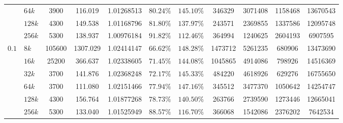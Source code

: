 \begin{table}
{\begin{tabular}{llccccccccc}
 & $64k$ & \num{3900} & 116.019 & \num{1.01268513} & $80.24\%$ & $145.10\%$ & \num{346329} & \num{3071408} & \num{1158468} & \num{13670543} \\
 & $128k$ & \num{4300} & 149.538 & \num{1.01168796} & $81.80\%$ & $137.97\%$ & \num{243571} & \num{2369855} & \num{1337586} & \num{12095748} \\
 & $256k$ & \num{5300} & 138.937 & \num{1.00976184} & $91.82\%$ & $112.46\%$ & \num{364994} & \num{1240625} & \num{2604193} & \num{6907595} \\
\midrule
\multirow{6}{*}{$0.1$} & $8k$ & \num{105600} & 1307.029 & \num{1.02414147} & $66.62\%$ & $148.28\%$ & \num{1473712} & \num{5261235} & \num{680906} & \num{13473690} \\
 & $16k$ & \num{25200} & 366.637 & \num{1.02338605} & $71.45\%$ & $144.08\%$ & \num{1045865} & \num{4914086} & \num{798926} & \num{14516369} \\
 & $32k$ & \num{3700} & 141.876 & \num{1.02368248} & $72.17\%$ & $145.33\%$ & \num{484220} & \num{4618926} & \num{629276} & \num{16755650} \\
 & $64k$ & \num{3700} & 111.080 & \num{1.02151466} & $77.94\%$ & $147.16\%$ & \num{345512} & \num{3477370} & \num{1050642} & \num{14254747} \\
 & $128k$ & \num{4300} & 156.764 & \num{1.01877268} & $78.73\%$ & $140.50\%$ & \num{263766} & \num{2739590} & \num{1273446} & \num{12665041} \\
 & $256k$ & \num{5300} & 133.040 & \num{1.01525949} & $88.57\%$ & $116.70\%$ & \num{366068} & \num{1542086} & \num{2376202} & \num{7642534} \\
\bottomrule
\end{tabular}}
\vspace{-5pt}
\end{table}

